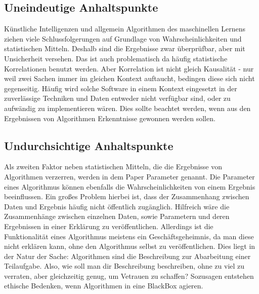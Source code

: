 \subsection{Uneindeutige Anhaltspunkte}
 Künstliche Intelligenzen und allgemein Algorithmen des maschinellen Lernens ziehen viele Schlussfolgerungen auf Grundlage von Wahrscheinlichkeiten und statistischen Mitteln.
 Deshalb sind die Ergebnisse zwar überprüfbar, aber mit Unsicherheit versehen.
 Das ist auch problematisch da häufig statistische Korrelationen benutzt werden. Aber Korrelation ist nicht gleich Kausalität - nur weil zwei Sachen immer im gleichen Kontext auftaucht, bedingen diese sich nicht gegenseitig.
 Häufig wird solche Software in einem Kontext eingesetzt in der zuverlässige Techniken und Daten entweder nicht verfügbar sind, oder zu aufwändig zu implementieren wären. Dies sollte beachtet werden, wenn aus den Ergebnissen von Algorithmen Erkenntnisse gewonnen werden sollen. 


\subsection{Undurchsichtige Anhaltspunkte}

 Als zweiten Faktor neben statistischen Mitteln, die die Ergebnisse von Algorithmen verzerren, werden in dem Paper Parameter genannt. Die Parameter eines Algorithmus können ebenfalls die Wahrscheinlichkeiten von einem Ergebnis beeinflussen. Ein großes Problem hierbei ist, dass der Zusammenhang zwischen Daten und Ergebnis häufig nicht öffentlich zugänglich. Hilfreich wäre die Zusammenhänge zwischen einzelnen Daten, sowie Parametern und deren Ergebnissen in einer Erklärung zu veröffentlichen. Allerdings ist die Funktionalität eines Algorithmus meistens ein Geschäftsgeheimnis, da man diese nicht erklären kann, ohne den Algorithmus selbst zu veröffentlichen. 
 Dies liegt in der Natur der Sache: Algorithmen sind die Beschreibung zur Abarbeitung einer Teilaufgabe. Also, wie soll man dir Beschreibung beschreiben, ohne zu viel zu verraten, aber gleichzeitig genug, um Vetrauen zu schaffen? 
 Sozusagen entstehen ethische Bedenken, wenn Algorithmen in eine BlackBox agieren. 
 

